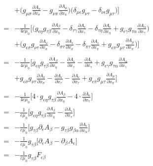 \documentclass{article}
\begin{document}
\begin{align}
  & + \bigg(g_{\mu\sigma} \frac{\partial A_\nu}{\partial x_\sigma} - g_{\nu\pi} \frac{\partial A_\mu}{\partial x_\pi} \bigg)
  \bigg( \delta_{\mu\epsilon}g_{\nu\tau} - \delta_{\nu\epsilon}g_{\mu\tau} \bigg)
  \bigg] \nonumber \\ \\
  = & -\frac{1}{4 c \mu_0}
  \bigg[
  \bigg(
  g_{\epsilon\eta}g_{\tau\beta}\frac{\partial A_\beta}{\partial x_\eta} - \delta_{\tau\gamma}\frac{\partial A_\epsilon}{\partial x_\gamma}
  - \delta_{\tau\eta}\frac{\partial A_\epsilon}{\partial x_\eta} + g_{\epsilon\gamma}g_{\tau\alpha}\frac{\partial A_\alpha}{\partial x_\gamma}
  \bigg) \nonumber \\
  & + \bigg(
  g_{\epsilon\sigma}g_{\nu\tau}\frac{\partial A_\nu}{\partial x_\sigma} - \delta_{\sigma\tau}\frac{\partial A_\epsilon}{\partial x_\sigma}
  - \delta_{\pi\tau}\frac{\partial A_\epsilon}{\partial x_\pi} + g_{\epsilon\pi}g_{\mu\tau}\frac{\partial A_\mu}{\partial x_\pi}
  \bigg)
  \bigg] \nonumber \\ \\
  = & -\frac{1}{4 c \mu_0}
  \bigg[
  g_{\epsilon\eta}g_{\tau\beta}\frac{\partial A_\beta}{\partial x_\eta} - \frac{\partial A_\epsilon}{\partial x_\tau}
  - \frac{\partial A_\epsilon}{\partial x_\tau} + g_{\epsilon\gamma}g_{\tau\alpha}\frac{\partial A_\alpha}{\partial x_\gamma} \nonumber \\
  & +   g_{\epsilon\sigma}g_{\nu\tau}\frac{\partial A_\nu}{\partial x_\sigma} - \frac{\partial A_\epsilon}{\partial x_\tau}
  - \frac{\partial A_\epsilon}{\partial x_\tau} + g_{\epsilon\pi}g_{\mu\tau}\frac{\partial A_\mu}{\partial x_\pi}
  \bigg] \nonumber \\ \\
  = & -\frac{1}{4 c \mu_0}
  \bigg[
  4 \cdot g_{\epsilon\eta}g_{\tau\beta}\frac{\partial A_\beta}{\partial x_\eta} - 4 \cdot \frac{\partial A_\epsilon}{\partial x_\tau}
  \bigg] \nonumber \\
  = & -\frac{1}{c \mu_0}
  \bigg[
  g_{\epsilon\eta}g_{\tau\beta}\frac{\partial A_\beta}{\partial x_\eta} - \frac{\partial A_\epsilon}{\partial x_\tau}
  \bigg] \nonumber \\
  = & -\frac{1}{c \mu_0}
  \bigg[
  g_{\tau\beta} \partial_\epsilon A_\beta - g_{\tau\beta}g_{\beta\alpha}\frac{\partial A_\epsilon}{\partial x_\alpha}
  \bigg] \nonumber \\
  = & -\frac{1}{c \mu_0} g_{\tau\beta}
  \bigg[
  \partial_\epsilon A_\beta - \partial_\beta A_\epsilon
  \bigg] \nonumber \\
  = & -\frac{1}{c \mu_0} g_{\tau\beta} F_{\epsilon\beta} \nonumber
\end{align}
\end{document}
